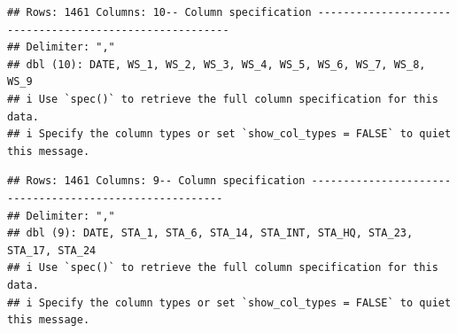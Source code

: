 \documentclass[
]{book}
\newenvironment{Shaded}{\begin{snugshade}}{\end{snugshade}}
\newcommand{\AttributeTok}[1]{\textcolor[rgb]{0.77,0.63,0.00}{#1}}
\newcommand{\CommentTok}[1]{\textcolor[rgb]{0.56,0.35,0.01}{\textit{#1}}}
\newcommand{\FunctionTok}[1]{\textcolor[rgb]{0.00,0.00,0.00}{#1}}
\newcommand{\NormalTok}[1]{#1}
\newcommand{\OtherTok}[1]{\textcolor[rgb]{0.56,0.35,0.01}{#1}}
\newcommand{\SpecialCharTok}[1]{\textcolor[rgb]{0.00,0.00,0.00}{#1}}
\newcommand{\StringTok}[1]{\textcolor[rgb]{0.31,0.60,0.02}{#1}}
\begin{document}
\begin{verbatim}
## Rows: 1461 Columns: 10-- Column specification --------------------------------------------------------
## Delimiter: ","
## dbl (10): DATE, WS_1, WS_2, WS_3, WS_4, WS_5, WS_6, WS_7, WS_8, WS_9
## i Use `spec()` to retrieve the full column specification for this data.
## i Specify the column types or set `show_col_types = FALSE` to quiet this message.
\end{verbatim}

\begin{Shaded}
\end{Shaded}

\begin{verbatim}
## Rows: 1461 Columns: 9-- Column specification --------------------------------------------------------
## Delimiter: ","
## dbl (9): DATE, STA_1, STA_6, STA_14, STA_INT, STA_HQ, STA_23, STA_17, STA_24
## i Use `spec()` to retrieve the full column specification for this data.
## i Specify the column types or set `show_col_types = FALSE` to quiet this message.
\end{verbatim}

\begin{Shaded}
\end{Shaded}
\end{document}
